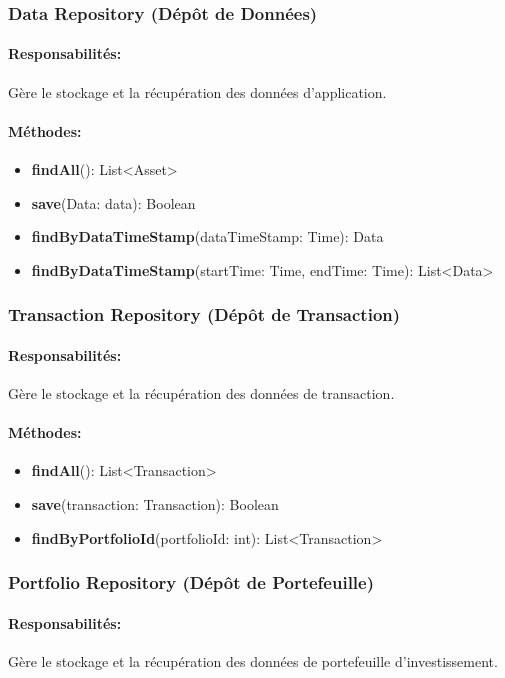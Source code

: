 \documentclass{article}
\begin{document}
\subsubsection{Data Repository (Dépôt de Données)}
\paragraph{Responsabilités:} Gère le stockage et la récupération des données d'application.
\paragraph{Méthodes:}
\begin{itemize}
  \item \textbf{findAll}(): List<Asset>
  \item \textbf{save}(Data: data): Boolean
  \item \textbf{findByDataTimeStamp}(dataTimeStamp: Time): Data
  \item \textbf{findByDataTimeStamp}(startTime: Time, endTime: Time): List<Data>
\end{itemize}
\subsubsection{Transaction Repository (Dépôt de Transaction)}
\paragraph{Responsabilités:} Gère le stockage et la récupération des données de transaction.
\paragraph{Méthodes:}
\begin{itemize}
  \item \textbf{findAll}(): List<Transaction>
  \item \textbf{save}(transaction: Transaction): Boolean
  \item \textbf{findByPortfolioId}(portfolioId: int): List<Transaction>
\end{itemize}
\subsubsection{Portfolio Repository (Dépôt de Portefeuille)}
\paragraph{Responsabilités:} Gère le stockage et la récupération des données de portefeuille d'investissement.
\end{document}
